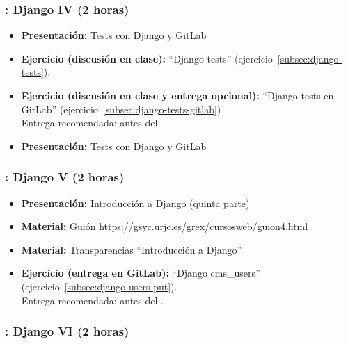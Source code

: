 \documentclass[a4paper,12pt]{article}
\begin{document}
\subsubsection{\juevesJ: Django IV (2 horas)}
\label{cal:juevesJ}

\begin{itemize}
\item \textbf{Presentación:} Tests con Django y GitLab
\item \textbf{Ejercicio (discusión en clase):} ``Django tests'' (ejercicio~\ref{subsec:django-tests}).
\item \textbf{Ejercicio (discusión en clase y entrega opcional):} ``Django tests en GitLab'' (ejercicio~\ref{subsec:django-tests-gitlab}) \\
  Entrega recomendada: antes del \juevesK
\item \textbf{Presentación:} Tests con Django y GitLab
\end{itemize}


\subsubsection{\juevesK: Django V (2 horas)}
\label{cal:juevesK}

\begin{itemize}
  \item \textbf{Presentación:} Introducción a Django (quinta parte)
  \item \textbf{Material:} Guión \url{https://gsyc.urjc.es/grex/cursosweb/guion4.html}
  \item \textbf{Material:} Transparencias ``Introducción a Django''
  \item \textbf{Ejercicio (entrega en GitLab):} ``Django cms\_users'' (ejercicio~\ref{subsec:django-users-put}). \\
   Entrega recomendada: antes del \juevesL.
 \end{itemize}
 


\subsubsection{\juevesL: Django VI (2 horas)}
\label{cal:juevesL}
\end{document}
